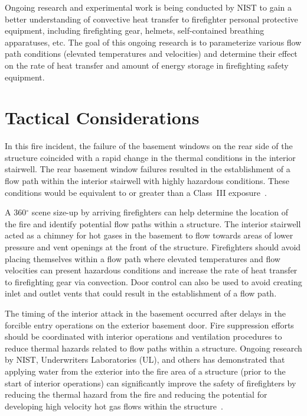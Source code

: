 \documentclass[12pt,oneside]{book}
\begin{document}
Ongoing research and experimental work is being conducted by NIST to gain a better understanding of convective heat transfer to firefighter personal protective equipment, including firefighting gear, helmets, self-contained breathing apparatuses, etc. The goal of this ongoing research is to parameterize various flow path conditions (elevated temperatures and velocities) and determine their effect on the rate of heat transfer and amount of energy storage in firefighting safety equipment.


\clearpage


\section{Tactical Considerations}
\label{sec:tactical_condsiderations}

In this fire incident, the failure of the basement windows on the rear side of the structure coincided with a rapid change in the thermal conditions in the interior stairwell. The rear basement window failures resulted in the establishment of a flow path within the interior stairwell with highly hazardous conditions. These conditions would be equivalent to or greater than a Class~III exposure~\cite{Donnelly2006}.

A 360$^\circ$ scene size-up by arriving firefighters can help determine the location of the fire and identify potential flow paths within a structure. The interior stairwell acted as a chimney for hot gases in the basement to flow towards areas of lower pressure and vent openings at the front of the structure. Firefighters should avoid placing themselves within a flow path where elevated temperatures and flow velocities can present hazardous conditions and increase the rate of heat transfer to firefighting gear via convection. Door control can also be used to avoid creating inlet and outlet vents that could result in the establishment of a flow path.

The timing of the interior attack in the basement occurred after delays in the forcible entry operations on the exterior basement door. Fire suppression efforts should be coordinated with interior operations and ventilation procedures to reduce thermal hazards related to flow paths within a structure. Ongoing research by NIST, Underwriters Laboratories (UL), and others has demonstrated that applying water from the exterior into the fire area of a structure (prior to the start of interior operations) can significantly improve the safety of firefighters by reducing the thermal hazard from the fire and reducing the potential for developing high velocity hot gas flows within the structure~\cite{madrzykowski2009fire, kerber2009fire}.
\end{document}
